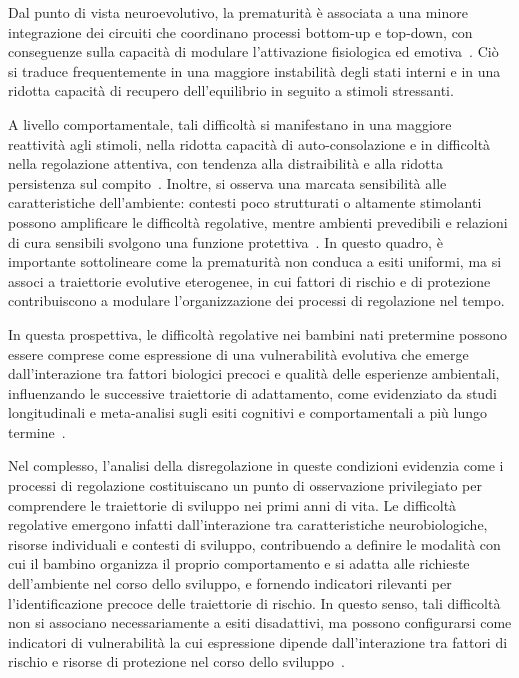             Dal punto di vista neuroevolutivo, la prematurità è associata a una minore integrazione dei circuiti che coordinano processi bottom-up e top-down, con conseguenze sulla capacità di modulare l'attivazione fisiologica ed emotiva~\cite{blair2015}. Ciò si traduce frequentemente in una maggiore instabilità degli stati interni e in una ridotta capacità di recupero dell'equilibrio in seguito a stimoli stressanti.

            A livello comportamentale, tali difficoltà si manifestano in una maggiore reattività agli stimoli, nella ridotta capacità di auto-consolazione e in difficoltà nella regolazione attentiva, con tendenza alla distraibilità e alla ridotta persistenza sul compito~\cite{montagna2016,clark2008}. Inoltre, si osserva una marcata sensibilità alle caratteristiche dell'ambiente: contesti poco strutturati o altamente stimolanti possono amplificare le difficoltà regolative, mentre ambienti prevedibili e relazioni di cura sensibili svolgono una funzione protettiva~\cite{tronick2007}. In questo quadro, è importante sottolineare come la prematurità non conduca a esiti uniformi, ma si associ a traiettorie evolutive eterogenee, in cui fattori di rischio e di protezione contribuiscono a modulare l'organizzazione dei processi di regolazione nel tempo.

            In questa prospettiva, le difficoltà regolative nei bambini nati pretermine possono essere comprese come espressione di una vulnerabilità evolutiva che emerge dall'interazione tra fattori biologici precoci e qualità delle esperienze ambientali, influenzando le successive traiettorie di adattamento, come evidenziato da studi longitudinali e meta-analisi sugli esiti cognitivi e comportamentali a più lungo termine~\cite{allotey2018}.

            Nel complesso, l'analisi della disregolazione in queste condizioni evidenzia come i processi di regolazione costituiscano un punto di osservazione privilegiato per comprendere le traiettorie di sviluppo nei primi anni di vita. Le difficoltà regolative emergono infatti dall'interazione tra caratteristiche neurobiologiche, risorse individuali e contesti di sviluppo, contribuendo a definire le modalità con cui il bambino organizza il proprio comportamento e si adatta alle richieste dell'ambiente nel corso dello sviluppo, e fornendo indicatori rilevanti per l'identificazione precoce delle traiettorie di rischio. In questo senso, tali difficoltà non si associano necessariamente a esiti disadattivi, ma possono configurarsi come indicatori di vulnerabilità la cui espressione dipende dall'interazione tra fattori di rischio e risorse di protezione nel corso dello sviluppo~\cite{cicchetti2009}.

